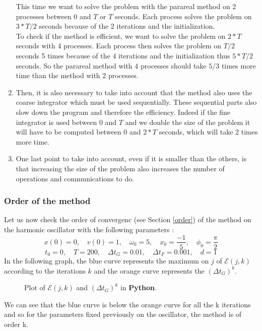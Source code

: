 \begin{enumerate}[label=\textbullet]
\begin{figure}[H]
		\label{efficient_2p_vs_4p}
	\end{figure}
	This time we want to solve the problem with the parareal method on 2 processes between 0 and $T$ or $T$ seconds. Each process solves the problem on $3*T/2$ seconds because of the 2 iterations and the initialization. \\
	To check if the method is efficient, we want to solve the problem on $2*T$ seconds with 4 processes. Each process then solves the problem on $T/2$ seconds 5 times because of the 4 iterations and the initialization thus $5*T/2$ seconds. So the parareal method with 4 processes should take $5/3$ times more time than the method with 2 processes.
	
	\item Then, it is also necessary to take into account that the method also uses the coarse integrator which must be used sequentially. These sequential parts also slow down the program and therefore the efficiency. Indeed if the fine integrator is used between 0 and $T$ and we double the size of the problem it will have to be computed between 0 and $2*T$ seconds, which will take 2 times more time. 
	
	\item One last point to take into account, even if it is smaller than the others, is that increasing the size of the problem also increases the number of operations and communications to do.
\end{enumerate}


\subsubsection{Order of the method}

\noindent Let us now check the order of convergenc (see Section \ref{order}) of the method on the harmonic oscillator with the following parameters :
$$x(0) = 0, \quad v(0) = 1, \quad \omega_0 = 5, \quad x_0 = \frac{-1}{5}, \quad \phi_0 = \frac{\pi}{2}$$
$$t_0=0, \quad T=200, \quad \Delta t_G=0.01, \quad \Delta t_F=0.001, \quad d=1$$
In the following graph, the blue curve represents the maximum on $j$ of $\mathcal{E}(j,k)$ according to the iterations $k$ and the orange curve represents the $(\Delta t_G)^k$.
\begin{figure}[H]
	\centering
	\caption{Plot of $\mathcal{E}(j,k)$ and $(\Delta t_G)^k$ in \textbf{Python}.}
\end{figure}
\noindent We can see that the blue curve is below the orange curve for all the k iterations and so for the parameters fixed previously on the oscillator, the method is of order k.

